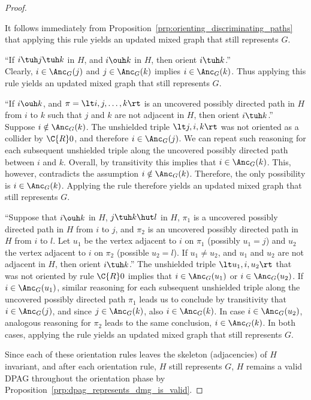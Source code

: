 \begin{proof}
\begin{description}
      It follows immediately from Proposition~\ref{prp:orienting_discriminating_paths} that applying this rule yields an updated mixed graph that still represents $G$.
    \item[$\C{R}8$] ``If $i \tuh j \tuh k$ in $H$, and $i \ouh k$ in $H$, then orient $i \tuh k$.''\\
      Clearly, $i \in \Anc_G(j)$ and $j \in \Anc_G(k)$ implies $i \in \Anc_G(k)$.
      Thus applying this rule yields an updated mixed graph that still represents $G$.
    \item[$\C{R}9$] ``If $i \ouh k$, and $\pi = \lt i, j, \dots, k \rt$ is an uncovered possibly directed path in $H$ from $i$ to $k$ such that $j$ and $k$ are not adjacent in $H$, then orient $i \tuh k$.''\\
      Suppose $i \notin \Anc_G(k)$.
      The unshielded triple $\lt j, i, k \rt$ was not oriented as a collider by $\C{R}0$, and therefore $i \in \Anc_G(j)$.
      We can repeat such reasoning for each subsequent unshielded triple along the uncovered possibly directed path between $i$ and $k$.
      Overall, by transitivity this implies that $i \in \Anc_G(k)$.
      This, however, contradicts the assumption $i \notin \Anc_G(k)$.
      Therefore, the only possibility is $i \in \Anc_G(k)$.
      Applying the rule therefore yields an updated mixed graph that still represents $G$.
    \item[$\C{R}10$] ``Suppose that $i \ouh k$ in $H$, $j \tuh k \hut l$ in $H$, $\pi_1$ is a uncovered possibly directed path in $H$ from $i$ to $j$, and $\pi_2$ is an uncovered possibly directed path in $H$ from $i$ to $l$. Let $u_1$ be the vertex adjacent to $i$ on $\pi_1$ (possibly $u_1 = j$) and $u_2$ the vertex adjacent to $i$ on $\pi_2$ (possible $u_2 = l$). If $u_1 \ne u_2$, and $u_1$ and $u_2$ are not adjacent in $H$, then orient $i \tuh k$.''
      The unshielded triple $\lt u_1, i, u_2 \rt$ that was not oriented by rule $\C{R}0$ implies that $i \in \Anc_G(u_1)$ or $i \in \Anc_G(u_2)$.
      If $i \in \Anc_G(u_1)$, similar reasoning for each subsequent unshielded triple along the uncovered possibly directed path $\pi_1$ leads us to conclude by transitivity that $i \in \Anc_G(j)$, and since $j \in \Anc_G(k)$, also $i \in \Anc_G(k)$.
      In case $i \in \Anc_G(u_2)$, analogous reasoning for $\pi_2$ leads to the same conclusion, $i \in \Anc_G(k)$.
      In both cases, applying the rule yields an updated mixed graph that still represents $G$.
  \end{description}
  Since each of these orientation rules leaves the skeleton (adjacencies) of $H$ invariant,
  and after each orientation rule, $H$ still represents $G$,
  $H$ remains a valid DPAG throughout the orientation phase
  by Proposition~\ref{prp:dpag_represents_dmg_is_valid}. 
\end{proof}

